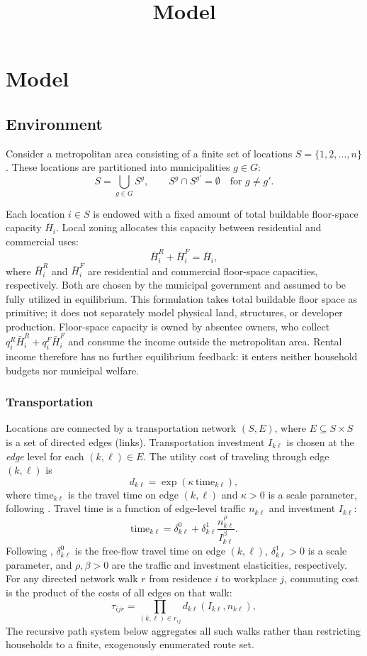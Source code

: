 \documentclass[12pt, a4paper]{article}
\title{Model}
\author{}
\date{}
\theoremstyle{definition}
\theoremstyle{remark}
\begin{document}
\maketitle

\section{Model}

\subsection{Environment}

Consider a metropolitan area consisting of a finite set of locations $S = \{1, 2, \ldots, n\}$. These locations are partitioned into municipalities $g \in G$:
\[
S = \bigcup_{g \in G} S^g, \qquad S^g \cap S^{g'} = \emptyset \quad \text{for } g \neq g'.
\]

Each location $i \in S$ is endowed with a fixed amount of total buildable floor-space capacity $\bar H_i$. Local zoning allocates this capacity between residential and commercial uses:
\[
\bar{H}_i^R + \bar{H}_i^F = \bar{H}_i,
\]
where $\bar H_i^R$ and $\bar H_i^F$ are residential and commercial floor-space capacities, respectively. Both are chosen by the municipal government and assumed to be fully utilized in equilibrium. This formulation takes total buildable floor space as primitive; it does not separately model physical land, structures, or developer production. Floor-space capacity is owned by absentee owners, who collect $q_i^R\bar H_i^R+q_i^F\bar H_i^F$ and consume the income outside the metropolitan area. Rental income therefore has no further equilibrium feedback: it enters neither household budgets nor municipal welfare.

\subsubsection{Transportation}
\label{sec:transportation}
Locations are connected by a transportation network $(S, E)$, where $E \subseteq S \times S$ is a set of directed edges (links). Transportation investment $I_{k\ell}$ is chosen at the \emph{edge} level for each $(k,\ell) \in E$. The utility cost of traveling through edge $(k,\ell)$ is
\[
d_{k\ell} = \exp\!\left(\kappa\,\mathrm{time}_{k\ell}\right),
\]
where $\mathrm{time}_{k\ell}$ is the travel time on edge $(k,\ell)$ and $\kappa > 0$ is a scale parameter, following \citet{Ahlfeldt2015-zb}. Travel time is a function of edge-level traffic $n_{k\ell}$ and investment $I_{k\ell}$:
\[
\mathrm{time}_{k\ell}
= \delta_{k\ell}^{0}
+\delta_{k\ell}^{1}\frac{n_{k\ell}^{\rho}}{I_{k\ell}^{\beta}}.
\]
Following \citet{Fajgelbaum2020-yv}, $\delta_{k\ell}^{0}$ is the free-flow travel time on edge $(k,\ell)$, $\delta_{k\ell}^{1} > 0$ is a scale parameter, and $\rho,\beta>0$ are the traffic and investment elasticities, respectively.
For any directed network walk $r$ from residence $i$ to workplace $j$, commuting cost is the product of the costs of all edges on that walk:
\[
\tau_{ijr} = \prod_{(k,\ell) \in r_{ij}} d_{k\ell}(I_{k\ell}, n_{k\ell}),
\]
The recursive path system below aggregates all such walks rather than restricting households to a finite, exogenously enumerated route set.
\end{document}

